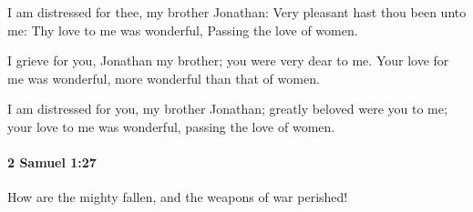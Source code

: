 			\begin{versebox}
					\item[BHS] 
					\item[ASV] I am distressed for thee, my brother Jonathan: Very pleasant hast thou been unto me: Thy love to me was wonderful, Passing the love of women.
					\item[NIV] I grieve for you, Jonathan my brother; you were very dear to me. Your love for me was wonderful, more wonderful than that of women.
					\item[NRSV] I am distressed for you, my brother Jonathan; greatly beloved were you to me; your love to me was wonderful, passing the love of women.
			\end{versebox}

		\paragraph{2 Samuel 1:27} %
			\label{2SAMUEL-1-27}

			How are the mighty fallen, and the weapons of war perished!

